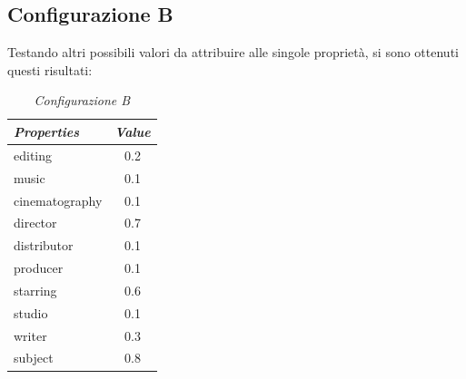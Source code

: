 \subsection{Configurazione B}
Testando altri possibili valori da attribuire alle singole proprietà, si sono ottenuti questi risultati:
\begin{table}[H]
	\small
	\centering
	\begin{tabular}{l c}
		\textit{Properties} & \textit{Value} \\\hline
		editing & 0.2 \\
		music & 0.1 \\
		cinematography & 0.1 \\
		director & 0.7 \\
		distributor & 0.1 \\
		producer & 0.1 \\
		starring & 0.6 \\
		studio & 0.1 \\
		writer & 0.3 \\
		subject & 0.8 \\
	\end{tabular}
	\caption{\emph{Configurazione B}}
\end{table}

